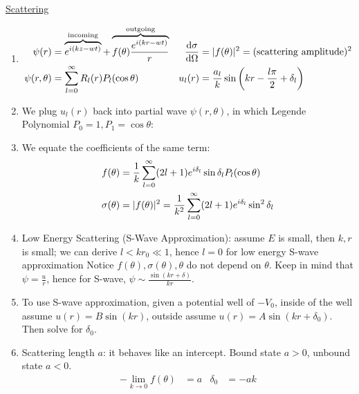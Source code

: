 \documentclass{school-22.101-notes}
\begin{document}
\clearpage

\uline{Scattering}
\begin{enumerate}
\item 
    \begin{align}
        \psi (r) &= \overbrace{e^{i  (k z - wt)}}^{\mathrm{incoming}} + \overbrace{ f(\theta) \frac{e^{i (k r - wt)}}{r} }^{\mathrm{outgoing}} 
        &  \frac{\mathrm{d}\sigma}{\mathrm{d}\Omega} &= |f(\theta)|^2 = (\mathrm{scattering \mbox{ } amplitude})^2 \\
        \psi(r,\theta) &= \displaystyle\sum_{l=0}^{\infty} R_l (r) P_l (\cos \theta) 
        &  u_l (r) &= \frac{a_l}{k} \sin \left( kr - \frac{l \pi}{2} + \delta_l \right) 
    \end{align}
%    
\item We plug $u_l(r)$ back into partial wave $\psi(r,\theta)$, in which Legende Polynomial $P_0 = 1, P_1 = \cos \theta$:
%
\item We equate the coefficients of the same term: 
\begin{align}
f(\theta) &= \frac{1}{k} \displaystyle\sum_{l=0}^{\infty} (2l+1) e^{i \delta_l} \sin \delta_l P_l (\cos \theta) \\
\sigma (\theta) &= |f(\theta)|^2 =  \frac{1}{k^2} \displaystyle\sum_{l=0}^{\infty} (2l+1) e^{i \delta_l} \sin^2 \delta_l 
\end{align}
%
\item Low Energy Scattering (S-Wave Approximation): assume $E$ is small, then $k,r$ is small; we can derive $l < kr_0 \ll 1$, hence $l=0$ for low energy S-wave approximation
Notice $f(\theta), \sigma (\theta), \theta$ do not depend on $\theta$. Keep in mind that $\psi = \frac{u}{r}$, hence for S-wave, $\psi \sim \frac{\sin (kr + \delta)}{kr}$.
%
\item To use S-wave approximation, given a potential well of $-V_0$, inside of the well assume $u(r) = B \sin (kr)$, outside assume $u(r) = A \sin(kr + \delta_0)$. Then solve for $\delta_0$.
%
\item Scattering length $a$: it behaves like an intercept. Bound state $a>0$, unbound state $a<0$.  
\begin{align}
- \lim_{k \to 0} f(\theta) &= a & \delta_0 &= -ak \\

\end{align}
\end{enumerate}
\end{document}
